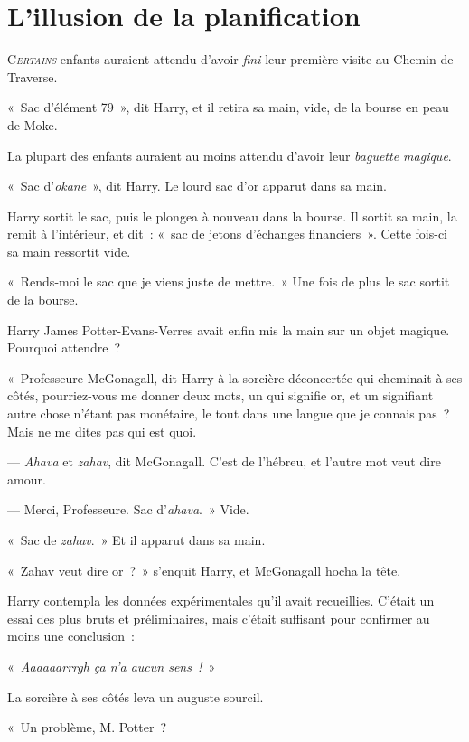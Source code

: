 
\chapter{L'illusion de la planification}

\lettrine{C}{\emph{ertains}} enfants auraient attendu d'avoir \emph{fini} leur première visite au Chemin de Traverse.

«~Sac d'élément 79~», dit Harry, et il retira sa main, vide, de la bourse en peau de Moke.

La plupart des enfants auraient au moins attendu d'avoir leur \emph{baguette magique}.

«~Sac d'\emph{okane}~», dit Harry. Le lourd sac d'or apparut dans sa main.

Harry sortit le sac, puis le plongea à nouveau dans la bourse. Il sortit sa main, la remit à l'intérieur, et dit~: «~sac de jetons d'échanges financiers~». Cette fois-ci sa main ressortit vide.

«~Rends-moi le sac que je viens juste de mettre.~» Une fois de plus le sac sortit de la bourse.

Harry James Potter-Evans-Verres avait enfin mis la main sur un objet magique. Pourquoi attendre~?

«~Professeure McGonagall, dit Harry à la sorcière déconcertée qui cheminait à ses côtés, pourriez-vous me donner deux mots, un qui signifie or, et un signifiant autre chose n'étant pas monétaire, le tout dans une langue que je connais pas~? Mais ne me dites pas qui est quoi.

--- \emph{Ahava} et \emph{zahav}, dit McGonagall. C'est de l'hébreu, et l'autre mot veut dire amour.

--- Merci, Professeure. Sac d'\emph{ahava}.~» Vide.

«~Sac de \emph{zahav}.~» Et il apparut dans sa main.

«~Zahav veut dire or~?~» s'enquit Harry, et McGonagall hocha la tête.

Harry contempla les données expérimentales qu'il avait recueillies.
C'était un essai des plus bruts et préliminaires, mais c'était suffisant pour confirmer au moins une conclusion~:

«~\emph{Aaaaaarrrgh ça n'a aucun sens~!}~»

La sorcière à ses côtés leva un auguste sourcil.

«~Un problème, M. Potter~?


